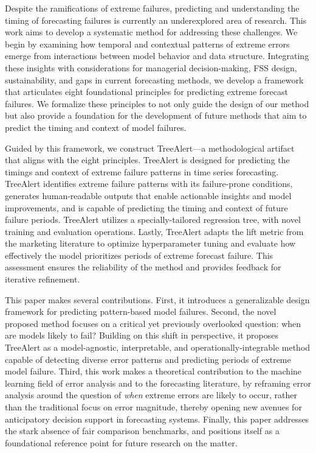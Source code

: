 \documentclass[]{interact}
\theoremstyle{plain}
\theoremstyle{definition}
\theoremstyle{remark}
\begin{document}
Despite the ramifications of extreme failures, predicting and understanding the timing of
forecasting failures is currently an underexplored area of research. This work aims to
develop a systematic method for addressing these challenges. We begin by examining how
temporal and contextual patterns of extreme errors emerge from interactions between model
behavior and data structure. Integrating these insights with considerations for managerial
decision-making, FSS design, sustainability, and gaps in current forecasting methods, we
develop a framework that articulates eight foundational principles for predicting extreme
forecast failures. We formalize these principles to not only guide the design of our method
but also provide a foundation for the development of future methods that aim to predict the
timing and context of model failures.

Guided by this framework, we construct TreeAlert---a methodological artifact that aligns
with the eight principles. TreeAlert is designed for predicting the timings and context of
extreme failure patterns in time series forecasting. TreeAlert identifies extreme failure
patterns with its failure-prone conditions, generates human-readable outputs that enable
actionable insights and model improvements, and is capable of predicting the timing and
context of future failure periods. TreeAlert utilizes a specially-tailored regression tree,
with novel training and evaluation operations. Lastly, TreeAlert adapts the lift metric from
the marketing literature to optimize hyperparameter tuning and evaluate how effectively the
model prioritizes periods of extreme forecast failure. This assessment ensures the
reliability of the method and provides feedback for iterative refinement.

This paper makes several contributions. First, it introduces a generalizable design
framework for predicting pattern-based model failures. Second, the novel proposed method
focuses on a critical yet previously overlooked question: when are models likely to fail?
Building on this shift in perspective, it proposes TreeAlert as a model-agnostic,
interpretable, and operationally-integrable method capable of detecting diverse error
patterns and predicting periods of extreme model failure. Third, this work makes a
theoretical contribution to the machine learning field of error analysis and to the
forecasting literature, by reframing error analysis around the question of \emph{when}
extreme errors are likely to occur, rather than the traditional focus on error magnitude,
thereby opening new avenues for anticipatory decision support in forecasting systems.
Finally, this paper addresses the stark absence of fair comparison benchmarks, and positions
itself as a foundational reference point for future research on the matter.
\end{document}
